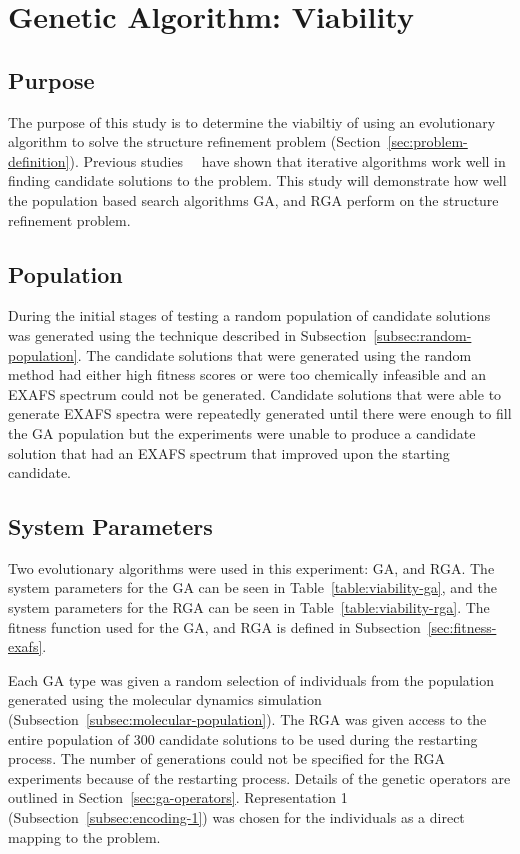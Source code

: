 \section{Genetic Algorithm: Viability}
\label{sec:ga-viability}

\subsection{Purpose}

The purpose of this study is to determine the viabiltiy of using an evolutionary algorithm to solve the structure refinement problem (Section~\ref{sec:problem-definition}). Previous studies~\cite{sproviero2008model}~\cite{luber2011s1} have shown that iterative algorithms work well in finding candidate solutions to the problem. This study will demonstrate how well the population based search algorithms GA, and RGA perform on the structure refinement problem.

\subsection{Population}

During the initial stages of testing a random population of candidate solutions was generated using the technique described in Subsection~\ref{subsec:random-population}. The candidate solutions that were generated using the random method had either high fitness scores or were too chemically infeasible and an EXAFS spectrum could not be generated. Candidate solutions that were able to generate EXAFS spectra were repeatedly generated until there were enough to fill the GA population but the experiments were unable to produce a candidate solution that had an EXAFS spectrum that improved upon the starting candidate.

\subsection{System Parameters}

Two evolutionary algorithms were used in this experiment: GA, and RGA. The system parameters for the GA can be seen in Table~\ref{table:viability-ga}, and the system parameters for the RGA can be seen in Table~\ref{table:viability-rga}. The fitness function used for the GA, and RGA is defined in Subsection~\ref{sec:fitness-exafs}.

Each GA type was given a random selection of individuals from the population generated using the molecular dynamics simulation (Subsection~\ref{subsec:molecular-population}). The RGA was given access to the entire population of 300 candidate solutions to be used during the restarting process. The number of generations could not be specified for the RGA experiments because of the restarting process. Details of the genetic operators are outlined in Section~\ref{sec:ga-operators}. Representation 1 (Subsection~\ref{subsec:encoding-1}) was chosen for the individuals as a direct mapping to the problem. 

